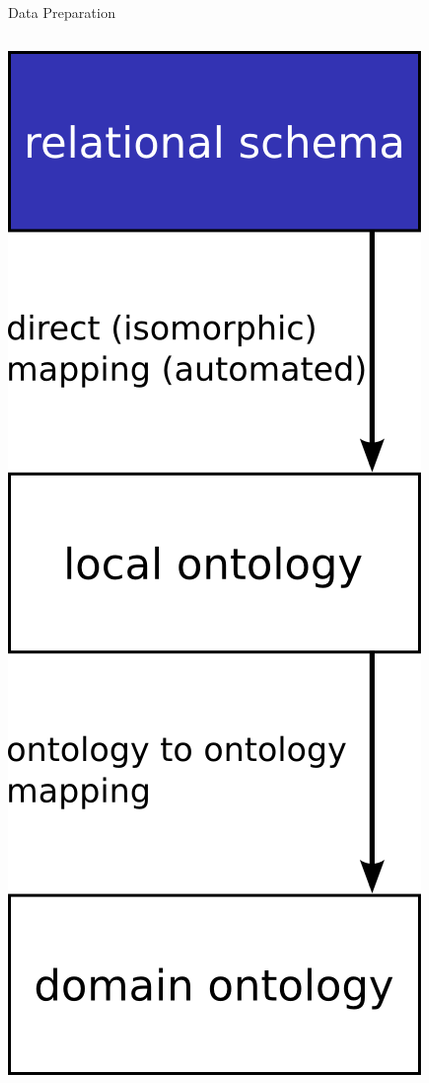 \documentclass{beamer}
\begin{document}
\begin{frame}{Data Preparation}
\begin{columns}
\begin{column}{.3\textwidth}
\includegraphics[width=\textwidth,height=.88\textheight,keepaspectratio]{g1}


\end{column}
\end{columns}
\end{frame}
\end{document}
